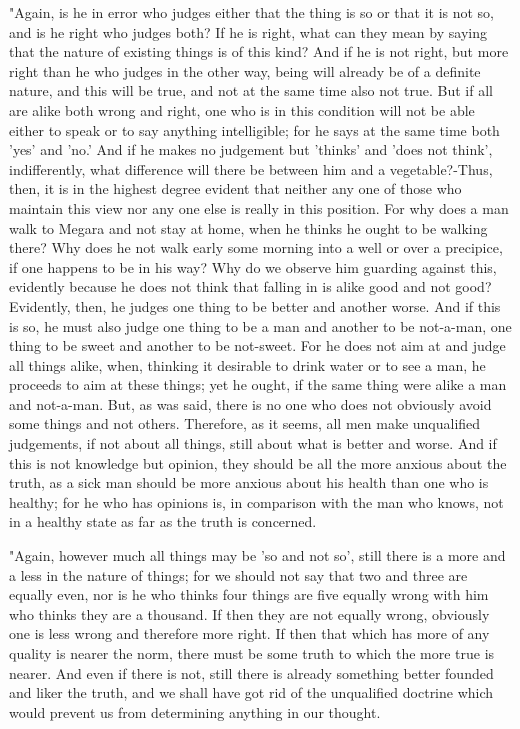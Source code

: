 "Again, is he in error who judges either that the thing is so or that
it is not so, and is he right who judges both? If he is right, what
can they mean by saying that the nature of existing things is of this
kind? And if he is not right, but more right than he who judges in
the other way, being will already be of a definite nature, and this
will be true, and not at the same time also not true. But if all are
alike both wrong and right, one who is in this condition will not
be able either to speak or to say anything intelligible; for he says
at the same time both 'yes' and 'no.' And if he makes no judgement
but 'thinks' and 'does not think', indifferently, what difference
will there be between him and a vegetable?-Thus, then, it is in the
highest degree evident that neither any one of those who maintain
this view nor any one else is really in this position. For why does
a man walk to Megara and not stay at home, when he thinks he ought
to be walking there? Why does he not walk early some morning into
a well or over a precipice, if one happens to be in his way? Why do
we observe him guarding against this, evidently because he does not
think that falling in is alike good and not good? Evidently, then,
he judges one thing to be better and another worse. And if this is
so, he must also judge one thing to be a man and another to be not-a-man,
one thing to be sweet and another to be not-sweet. For he does not
aim at and judge all things alike, when, thinking it desirable to
drink water or to see a man, he proceeds to aim at these things; yet
he ought, if the same thing were alike a man and not-a-man. But, as
was said, there is no one who does not obviously avoid some things
and not others. Therefore, as it seems, all men make unqualified judgements,
if not about all things, still about what is better and worse. And
if this is not knowledge but opinion, they should be all the more
anxious about the truth, as a sick man should be more anxious about
his health than one who is healthy; for he who has opinions is, in
comparison with the man who knows, not in a healthy state as far as
the truth is concerned. 

"Again, however much all things may be 'so and not so', still there
is a more and a less in the nature of things; for we should not say
that two and three are equally even, nor is he who thinks four things
are five equally wrong with him who thinks they are a thousand. If
then they are not equally wrong, obviously one is less wrong and therefore
more right. If then that which has more of any quality is nearer the
norm, there must be some truth to which the more true is nearer. And
even if there is not, still there is already something better founded
and liker the truth, and we shall have got rid of the unqualified
doctrine which would prevent us from determining anything in our thought.

